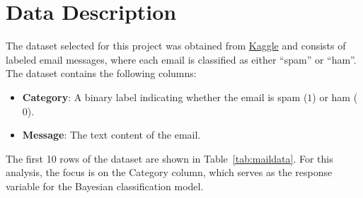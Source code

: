 \documentclass[12pt,a4paper]{article}
\begin{document}
\section{Data Description}\label{sec:datasdescription}
The dataset selected for this project was obtained from
\href{https://www.kaggle.com/datasets/venky73/spam-mails-dataset}{Kaggle} and consists of labeled email
messages, where each email is classified as either ``spam'' or ``ham''. The dataset contains the following
columns:
\begin{itemize}
    \item \textbf{Category}: A binary label indicating whether the email is spam ($1$) or ham ($0$).
    \item \textbf{Message}: The text content of the email.
\end{itemize}
The first 10 rows of the dataset are shown in Table~\ref{tab:maildata}. For this analysis, the focus is on
the Category column, which serves as the response variable for the Bayesian classification model.

\setcounter{table}{0}
\end{document}
